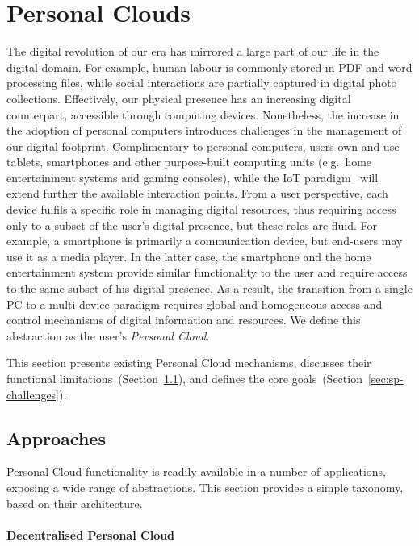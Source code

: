 \section{Personal Clouds}\label{sec:signpost-introduction}

The digital revolution of our era has mirrored a large part of our life in the
digital domain. For example, human labour is commonly stored in PDF and word
processing files, while social interactions are partially captured in digital
photo collections.  Effectively, our physical presence has an increasing
digital counterpart, accessible through computing devices.  Nonetheless, the
increase in the adoption of personal computers introduces challenges in the
management of our digital footprint.  Complimentary to personal computers,
users own and use tablets, smartphones and other purpose-built computing units
(e.g.~home entertainment systems and gaming consoles), while the IoT
paradigm~ will extend further the available interaction
points.  From a user perspective, each device fulfils a specific role in
managing digital resources, thus requiring access only to a subset of the
user's digital presence, but these roles are fluid. For example, a smartphone
is primarily a communication device, but end-users may use it as a media
player. In the latter case, the smartphone and the home entertainment system
provide similar functionality to the user and require access to the same subset
of his digital presence. As a result, the transition from a single PC to a
multi-device paradigm requires global and homogeneous access and control
mechanisms of digital information and resources. We define this abstraction as
the user's \emph{Personal Cloud}. 

This section presents existing Personal Cloud mechanisms, discusses their
functional limitations~(Section~\ref{sec:sp-approaches}), and defines the core
\signpost goals~(Section~\ref{sec:sp-challenges}). 

\subsection{Approaches} \label{sec:sp-approaches}

Personal Cloud functionality is readily available in a number of applications,
exposing a wide range of abstractions. This section provides a simple taxonomy,
based on their architecture. 

\paragraph*{Decentralised Personal Cloud}

